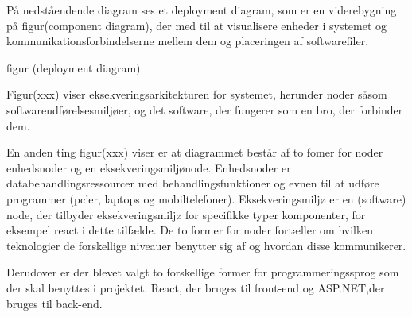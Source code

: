 På nedståendende diagram ses et deployment diagram, som er en viderebygning på figur(component diagram), der med til at visualisere enheder i systemet og kommunikationsforbindelserne mellem dem og placeringen af softwarefiler.

figur  (deployment diagram)

Figur(xxx) viser eksekveringsarkitekturen for systemet, herunder noder såsom softwareudførelsesmiljøer, og det software, der fungerer som en bro, der  forbinder dem. 

En anden ting figur(xxx) viser er at diagrammet består af to fomer for noder enhedsnoder og en eksekveringsmiljønode. Enhedsnoder er  databehandlingsressourcer med behandlingsfunktioner og evnen til at udføre programmer (pc'er, laptops og mobiltelefoner).  Eksekveringsmiljø er en (software) node, der tilbyder eksekveringsmiljø for specifikke typer komponenter, for eksempel react i dette tilfælde. De to former for noder fortæller om hvilken teknologier de forskellige niveauer benytter sig af og hvordan disse kommunikerer.

Derudover er der blevet valgt to forskellige former for programmeringssprog som der skal benyttes i projektet. React, der bruges til front-end og ASP.NET,der bruges til back-end. 

